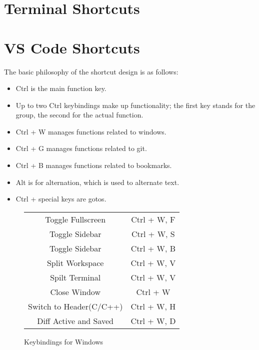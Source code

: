 \documentclass[10pt]{article}
\begin{document}
\section{Terminal Shortcuts} \label{S_Terminal}


\section{VS Code Shortcuts} \label{S_VSCode}
	The basic philosophy of the shortcut design is as follows:

	\begin{itemize}
		\item Ctrl is the main function key.
		\item Up to two Ctrl keybindings make up functionality; the first key stands for the group, the second for the actual function.
		\item Ctrl + W manages functions related to windows.
		\item Ctrl + G manages functions related to git.
		\item Ctrl + B manages functions related to bookmarks.
		\item Alt is for alternation, which is used to alternate text.
		\item Ctrl + special keys are gotos.
	\end{itemize}

	\begin{figure}[H]
		\centering
		\begin{tabular}{@{}c c@{}}
			\midrule

			Toggle Fullscreen & Ctrl + W, F \\
			Toggle Sidebar & Ctrl + W, S \\
			Toggle Sidebar & Ctrl + W, B \\
			Split Workspace & Ctrl + W, V \\
			Spilt Terminal & Ctrl + W, V \\
			Close Window & Ctrl + W \\
			Switch to Header(C/C++) & Ctrl + W, H \\
			Diff Active and Saved & Ctrl + W, D \\

			\bottomrule
		\end{tabular}
		\caption{Keybindings for Windows}
	\end{figure}
\end{document}
